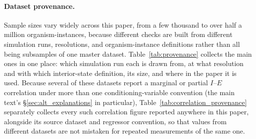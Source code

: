 \documentclass[11pt]{article}
\begin{document}
\paragraph{Dataset provenance.} Sample sizes vary widely across this paper, from a few thousand to over half a million organism-instances, because different checks are built from different simulation runs, resolutions, and organism-instance definitions rather than all being subsamples of one master dataset. Table~\ref{tab:provenance} collects the main ones in one place: which simulation run each is drawn from, at what resolution and with which interior-state definition, its size, and where in the paper it is used. Because several of these datasets report a marginal or partial $I$--$E$ correlation under more than one conditioning-variable convention (the main text's \S\ref{sec:alt_explanations} in particular), Table~\ref{tab:correlation_provenance} separately collects every such correlation figure reported anywhere in this paper, alongside its source dataset and regressor convention, so that values from different datasets are not mistaken for repeated measurements of the same one.
\end{document}
